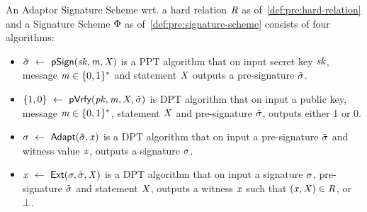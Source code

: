 \begin{definition}\label{def:pre:script:apt}
    An Adaptor Signature Scheme wrt. a hard relation $\mathit{R}$ as of~\cref{def:pre:hard-relation} and a Signature Scheme $\Phi$ as of~\cref{def:pre:signature-scheme} consists of four algorithms:
    \begin{itemize}
        \item $\tilde{\sigma} ~\leftarrow~ \mathsf{pSign}(\mathit{sk}, \mathit{m}, \mathit{X})$ is a PPT algorithm that on input secret key $\mathit{sk}$, message $\mathit{m} \in \{0,1\}^{*}$ and statement $\mathit{X}$ outputs a pre-signature $\tilde{\sigma}$.
        \item $\{1,0\} ~\leftarrow~ \mathsf{pVrfy}(\mathit{pk}, \mathit{m}, \mathit{X}, \tilde{\sigma})$ is DPT algorithm that on input a public key, message $\mathit{m} \in \{0,1\}^{*}$, statement $\mathit{X}$ and pre-signature $\tilde{\sigma}$, outputs either 1 or 0.
        \item $\sigma ~\leftarrow~ \mathsf{Adapt}(\tilde{\sigma}, \mathit{x})$ is a DPT algorithm that on input a pre-signature $\tilde{\sigma}$ and witness value $\mathit{x}$, outputs a signature $\sigma$.
        \item $\mathit{x} ~\leftarrow~ \mathsf{Ext}(\sigma, \tilde{\sigma}, \mathit{X})$ is a DPT algorithm that on input a signature $\sigma$, pre-signature $\tilde{\sigma}$ and statement $\mathit{X}$, outputs a witness $\mathit{x}$ such that $(\mathit{x}, \mathit{X}) \in \mathit{R}$, or $\bot$.
    \end{itemize}
\end{definition}

